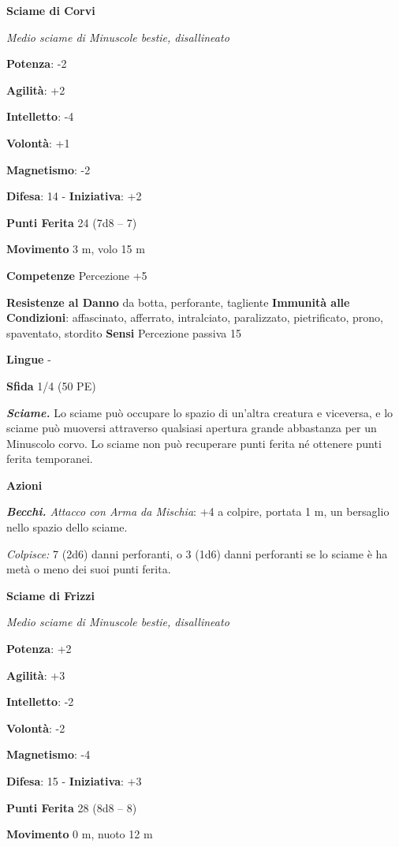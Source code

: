 \begin{multicols}{2}
\textbf{Sciame di Corvi}

\emph{Medio sciame di Minuscole bestie, disallineato}

\textbf{Potenza}: -2

\textbf{Agilità}: +2

\textbf{Intelletto}: -4

\textbf{Volontà}: +1

\textbf{Magnetismo}: -2

\textbf{Difesa}: 14 - \textbf{Iniziativa}: +2

\textbf{Punti Ferita} 24 (7d8 -- 7)

\textbf{Movimento} 3 m, volo 15 m

\textbf{Competenze} Percezione +5

\textbf{Resistenze al Danno} da botta, perforante, tagliente
\textbf{Immunità alle Condizioni}: affascinato, afferrato, intralciato,
paralizzato, pietrificato, prono, spaventato, stordito \textbf{Sensi}
Percezione passiva 15

\textbf{Lingue} -

\textbf{Sfida} 1/4 (50 PE)\smallskip

\emph{\textbf{Sciame.}} Lo sciame può occupare lo spazio di un'altra
creatura e viceversa, e lo sciame può muoversi attraverso qualsiasi
apertura grande abbastanza per un Minuscolo corvo. Lo sciame non può
recuperare punti ferita né ottenere punti ferita temporanei.

\smallskip\textbf{Azioni}

\emph{\textbf{Becchi.} Attacco con Arma da Mischia}: +4 a colpire,
portata 1 m, un bersaglio nello spazio dello sciame.

\emph{Colpisce:} 7 (2d6) danni perforanti, o 3 (1d6) danni perforanti se
lo sciame è ha metà o meno dei suoi punti ferita.



\textbf{Sciame di Frizzi}

\emph{Medio sciame di Minuscole bestie, disallineato}

\textbf{Potenza}: +2

\textbf{Agilità}: +3

\textbf{Intelletto}: -2

\textbf{Volontà}: -2

\textbf{Magnetismo}: -4

\textbf{Difesa}: 15 - \textbf{Iniziativa}: +3

\textbf{Punti Ferita} 28 (8d8 -- 8)

\textbf{Movimento} 0 m, nuoto 12 m


\end{multicols}
